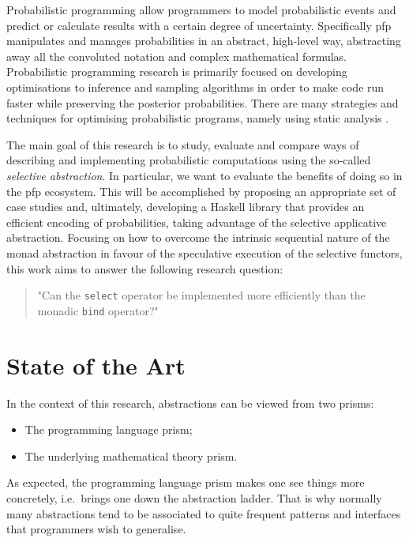 \documentclass[
  oneside,
  11pt, a4paper,
  footinclude=true,
  headinclude=true,
  cleardoublepage=empty
]{scrbook}
\theoremstyle{definition}
\theoremstyle{definition}
\begin{document}
	Probabilistic programming allow programmers to model probabilistic events and predict or calculate results with a certain degree of uncertainty. Specifically \gls{pfp} manipulates and manages probabilities in an abstract, high-level way, abstracting away all the convoluted notation and complex mathematical formulas. Probabilistic programming research is primarily focused on developing optimisations to inference and sampling algorithms in order to make code run faster while preserving the posterior probabilities. There are many strategies and techniques for optimising probabilistic programs, namely using static analysis \citep{bernstein2019static}.
    
    The main goal of this research is to study, evaluate and compare ways of describing and implementing probabilistic computations using the so-called \emph{selective abstraction}. In particular, we want to evaluate the benefits of doing so in the \gls{pfp} ecosystem. This will be accomplished by proposing an appropriate set of case studies and, ultimately, developing a Haskell library that provides an efficient encoding of probabilities, taking advantage of the selective applicative abstraction. Focusing on how to overcome the intrinsic sequential nature of the monad abstraction \citep{Scibior:2015:PPP:2887747.2804317} in favour of the speculative execution of the selective functors, this work aims to answer the following research question:
        \begin{quote}
        "Can the \texttt{select} operator be implemented more efficiently than the monadic \texttt{bind} operator?"
        \end{quote}

	\section{State of the Art}\label{sec-state-art}
	In the context of this research, abstractions can be viewed from two prisms:
	\begin{itemize}
	   \item The programming language prism;
	   \item The underlying mathematical theory prism.
	\end{itemize}{}
	    
	As expected, the programming language prism makes one see things more concretely, i.e.\ brings one down the abstraction ladder. That is why normally many abstractions tend to be associated to quite frequent patterns and interfaces that programmers wish to generalise.
	    
\end{document}

